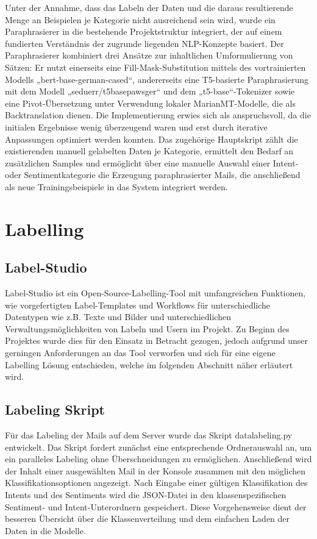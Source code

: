 Unter der Annahme, dass das Labeln der Daten und die daraus resultierende Menge an Beispielen 
je Kategorie nicht ausreichend sein wird, wurde ein Paraphrasierer in die bestehende Projektstruktur 
integriert, der auf einem fundierten Verständnis der zugrunde liegenden NLP-Konzepte basiert. 
Der Paraphrasierer kombiniert drei Ansätze zur inhaltlichen Umformulierung von Sätzen: 
Er nutzt einerseits eine Fill-Mask-Substitution mittels des vortrainierten Modells 
„bert-base-german-cased“, andererseits eine T5-basierte Paraphrasierung mit dem Modell 
„seduerr/t5\textunderscore base\textunderscore paws\textunderscore ger“ und dem „t5-base“-Tokenizer sowie eine Pivot-Übersetzung unter 
Verwendung lokaler MarianMT-Modelle, die als Backtranslation dienen. Die Implementierung erwies sich 
als anspruchsvoll, da die initialen Ergebnisse wenig überzeugend waren und erst durch iterative 
Anpassungen optimiert werden konnten. Das zugehörige Hauptskript zählt die existierenden manuell 
gelabelten Daten je Kategorie, ermittelt den Bedarf an zusätzlichen Samples und ermöglicht über eine 
manuelle Auswahl einer Intent- oder Sentimentkategorie die Erzeugung paraphrasierter Mails, 
die anschließend als neue Trainingsbeispiele in das System integriert werden.

\section{Labelling}

\subsection{Label-Studio}

Label-Studio ist ein Open-Source-Labelling-Tool mit umfangreichen Funktionen,
wie vorgefertigten Label-Templates und Workflows für unterschiedliche Datentypen
wie z.B. Texte und Bilder und unterschiedlichen Verwaltungsmöglichkeiten von Labeln
und Usern im Projekt. Zu Beginn des Projektes wurde dies für den Einsatz in Betracht
gezogen, jedoch aufgrund unser gerningen Anforderungen an das Tool  verworfen und sich für
eine eigene Labelling Lösung entschieden, welche im folgenden Abschnitt näher erläutert wird.  

\subsection{Labeling Skript}
Für das Labeling der Mails auf dem Server wurde das Skript data\textunderscore labeling.py
entwickelt. Das Skript fordert zunächst eine entsprechende Ordnerauswahl an, um ein
paralleles Labeling ohne Überschneidungen zu ermöglichen. Anschließend wird der Inhalt einer
ausgewählten Mail in der Konsole zusammen mit den möglichen Klassifikationsoptionen
angezeigt. Nach Eingabe einer gültigen Klassifikation des Intents und des Sentiments
wird die JSON-Datei in den klassenspezifischen Sentiment- und Intent-Unterordnern
gespeichert. Diese Vorgehensweise dient der besseren Übersicht über die Klassenverteilung
und dem einfachen Laden der Daten in die Modelle. 

